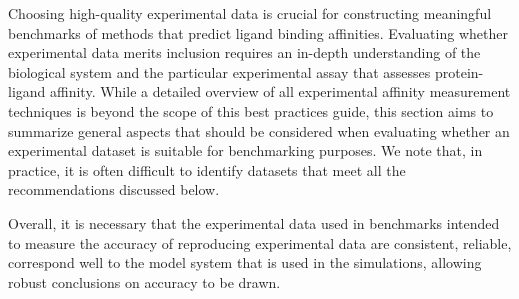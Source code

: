 \documentclass[9pt,bestpractices,pubversion]{livecoms}
\begin{document}
Choosing high-quality experimental data is crucial for constructing meaningful benchmarks of methods that predict ligand binding affinities. 
Evaluating whether experimental data merits inclusion requires an in-depth understanding of the biological system and the particular experimental assay that assesses protein-ligand affinity.
While a detailed overview of all experimental affinity measurement techniques is beyond the scope of this best practices guide, this section aims to summarize general aspects that should be considered when evaluating whether an experimental dataset is suitable for benchmarking purposes. 
We note that, in practice, it is often difficult to identify datasets that meet all the recommendations discussed below.

Overall, it is necessary that the experimental data used in benchmarks intended to measure the accuracy of reproducing experimental data are consistent, reliable, correspond well to the model system that is used in the simulations, allowing robust conclusions on accuracy to be drawn.
\end{document}
